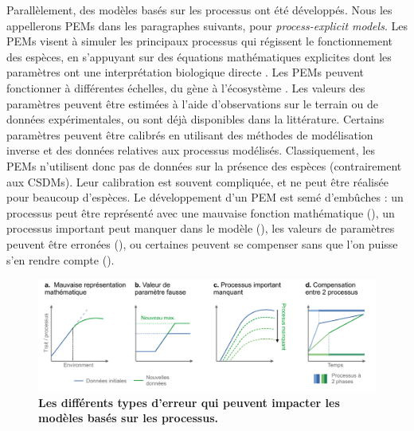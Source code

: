 Parallèlement, des modèles basés sur les processus ont été développés. Nous les appellerons PEMs dans les paragraphes suivants, pour \emph{process-explicit models}. Les PEMs visent à simuler les principaux processus qui régissent le fonctionnement des espèces, en s'appuyant sur des équations mathématiques explicites dont les paramètres ont une interprétation biologique directe \citep{Dormann2012}. Les PEMs peuvent fonctionner à différentes échelles, du gène à l'écosystème \citep{Pilowsky2022}. 
Les valeurs des paramètres peuvent être estimées à l'aide d'observations sur le terrain ou de données expérimentales, ou sont déjà disponibles dans la littérature. Certains paramètres peuvent être calibrés en utilisant des méthodes de modélisation inverse et des données relatives aux processus modélisés. Classiquement, les PEMs n'utilisent donc pas de données sur la présence des espèces (contrairement aux CSDMs). Leur calibration est souvent compliquée, et ne peut être réalisée pour beaucoup d'espèces.
Le développement d'un PEM est semé d'embûches : un processus peut être représenté avec une mauvaise fonction mathématique (), un processus important peut manquer dans le modèle (), les valeurs de paramètres peuvent être erronées (), ou certaines peuvent se compenser sans que l'on puisse s'en rendre compte ().

\begin{figure}
\vspace*{-0cm}
\centering
\includegraphics{resume/figs/pbm_issue_FR.pdf}
\caption{\textbf{Les différents types d'erreur qui peuvent impacter les modèles basés sur les processus.}}
\vspace*{-0cm}
\label{fig:R2}
\end{figure}

